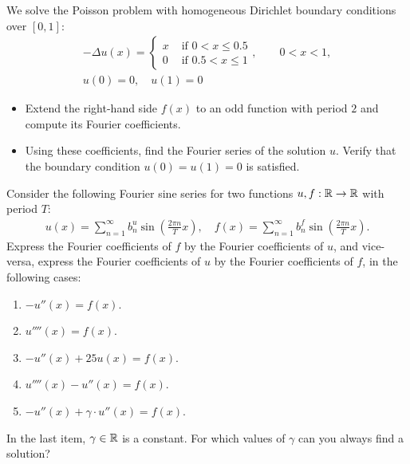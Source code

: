 \documentclass[11pt]{article}
\begin{document}
\begin{exercise}
    We solve the Poisson problem with homogeneous Dirichlet boundary conditions over $[0,1]$:
    \begin{gather*}
        - \Delta u(x) = \left\{\begin{array}{ll} x & \text{ if } 0 < x \leq 0.5 \\ 0 & \text{ if } 0.5 < x \leq 1 \end{array}\right., \qquad 0 < x < 1,
        \\
        u(0) = 0, \quad u(1) = 0
    \end{gather*}
    \begin{itemize}
        \item Extend the right-hand side $f(x)$ to an odd function with period $2$ and compute its Fourier coefficients.
        \item Using these coefficients, find the Fourier series of the solution $u$. Verify that the boundary condition $u(0) = u(1) = 0$ is satisfied.
    \end{itemize}
\end{exercise}
\begin{solution}     
\end{solution}














\begin{exercise}
    Consider the following Fourier sine series for two functions $u, f : \mathbb{R} \to \mathbb{R}$ with period $T$:
    \begin{align*}
        u(x) = \sum_{n=1}^{\infty} b_{n}^{u} \sin\left( \frac{2\pi n}{T} x \right)
        ,
        \quad 
        f(x) = \sum_{n=1}^{\infty} b_{n}^{f} \sin\left( \frac{2\pi n}{T} x \right)
        .
    \end{align*}
    Express the Fourier coefficients of $f$ by the Fourier coefficients of $u$, and vice-versa, express the Fourier coefficients of $u$ by the Fourier coefficients of $f$,
    in the following cases:
    \begin{enumerate}[label=(\alph*)]
     \item 
     $-u''(x) = f(x)$.
     \item 
     $u''''(x) = f(x)$.
     \item 
     $-u''(x) + 25 u(x) = f(x)$.
     \item 
     $u''''(x) - u''(x) = f(x)$.
     \item 
     $-u''(x) + \gamma \cdot u''(x) = f(x)$.
    \end{enumerate}
    In the last item, $\gamma \in \mathbb{R}$ is a constant. For which values of $\gamma$ can you always find a solution?
\end{exercise}
\begin{solution}     
\end{solution}
\end{document}
